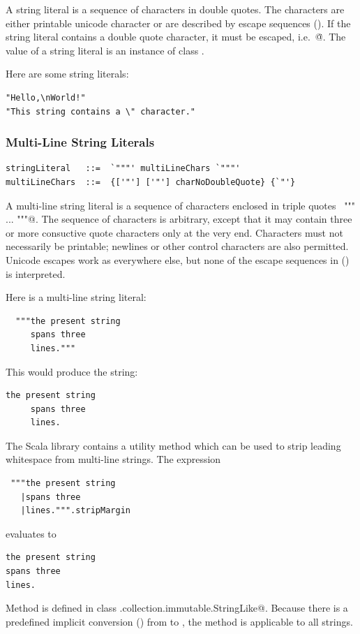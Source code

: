 A string literal is a sequence of characters in double quotes.  The
characters are either printable unicode character or are described by
escape sequences (). If the string literal
contains a double quote character, it must be escaped,
i.e.\ \lstinline@\"@. The value of a string literal is an instance of
class \lstinline@String@. 

\example
Here are some string literals:
\begin{lstlisting}
"Hello,\nWorld!"       
"This string contains a \" character."
\end{lstlisting}

\subsubsection*{Multi-Line String Literals}

\syntax\begin{lstlisting}
stringLiteral   ::=  `"""' multiLineChars `"""'
multiLineChars  ::=  {['"'] ['"'] charNoDoubleQuote} {`"'}
\end{lstlisting}

A multi-line string literal is a sequence of characters enclosed in
triple quotes ~\lstinline@""" ... """@. The sequence of characters is
arbitrary, except that it may contain three or more consuctive quote characters
only at the very end. Characters
must not necessarily be printable; newlines or other
control characters are also permitted.  Unicode escapes work as everywhere else, but none
of the escape sequences in () is interpreted.

\example Here is a multi-line string literal:
\begin{lstlisting}
  """the present string
     spans three 
     lines."""
\end{lstlisting}
This would produce the string:
\begin{lstlisting}
the present string
     spans three 
     lines.
\end{lstlisting}
The Scala library contains a utility method \lstinline@stripMargin@
which can be used to strip leading whitespace from multi-line strings.
The expression
\begin{lstlisting}
 """the present string
   |spans three 
   |lines.""".stripMargin
\end{lstlisting}
evaluates to
\begin{lstlisting}
the present string
spans three 
lines.
\end{lstlisting}
Method \lstinline@stripMargin@ is defined in class
\lstinline@scala.collection.immutable.StringLike@. 
Because there is a predefined
implicit conversion () from  to
, the method is applicable to all strings.

